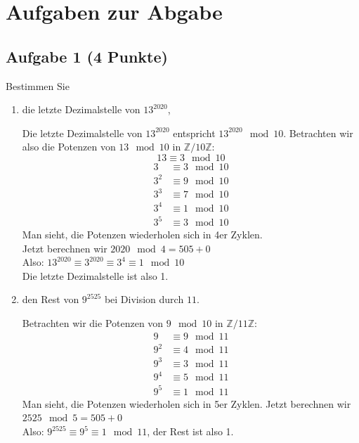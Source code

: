 \documentclass{article} %
\begin{document}
\section*{Aufgaben zur Abgabe}

\subsection*{Aufgabe 1 (4 Punkte)}
Bestimmen Sie
\begin{enumerate}
    \item[(a)] die letzte Dezimalstelle von $13^{2020}$,
    \begin{mybox}
    Die letzte Dezimalstelle von $13^{2020}$ entspricht $13^{2020} \mod 10$. Betrachten wir also die Potenzen von  $13 \mod 10$ in $\mathbb{Z} / 10 \mathbb{Z}$: 
    \[13 \equiv 3 \mod 10\]
    \begin{align*}
        3 &  \equiv 3 \mod 10 \\
        3^2 &  \equiv 9 \mod 10 \\
        3^3 &  \equiv 7 \mod 10 \\
        3^4 &  \equiv 1 \mod 10 \\
        3^5 &  \equiv 3 \mod 10 
    \end{align*}
    Man sieht, die Potenzen wiederholen sich in 4er Zyklen.  \\
    Jetzt berechnen wir $2020 \mod 4 = 505 + 0$\\
    Also: $13^{2020} \equiv 3^{2020} \equiv 3^4 \equiv 1 \mod 10$ \\
    Die letzte Dezimalstelle ist also 1. 
    \end{mybox}
    \item[(b)] den Rest von $9^{2525}$ bei Division durch $11$.
    \begin{mybox}
    Betrachten wir die Potenzen von  $9 \mod 10$ in $\mathbb{Z} / 11 \mathbb{Z}$:
    \begin{align*}
        9& \equiv 9 \mod 11 \\
        9^2 & \equiv 4 \mod 11 \\
        9^3 & \equiv 3 \mod 11 \\
        9^4 & \equiv 5 \mod 11 \\
        9^5 & \equiv 1 \mod 11 
    \end{align*}
    Man sieht, die Potenzen wiederholen sich in 5er Zyklen. 
    Jetzt berechnen wir $ 2525 \mod 5 = 505 + 0$\\
    Also: $9^{2525} \equiv 9^5 \equiv 1 \mod 11$, der Rest ist also 1.\\
    \end{mybox}
\end{enumerate}
\newpage 
\end{document}
